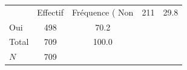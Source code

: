 {
\def\sym#1{\ifmmode^{#1}\else\(^{#1}\)\fi}
\begin{tabular}{l*{1}{cc}}
\toprule
            &    Effectif&Fréquence (%
\midrule
Non         &         211&        29.8\\
Oui         &         498&        70.2\\
Total       &         709&       100.0\\
\midrule
\(N\)       &         709&            \\
\bottomrule
\end{tabular}
}
